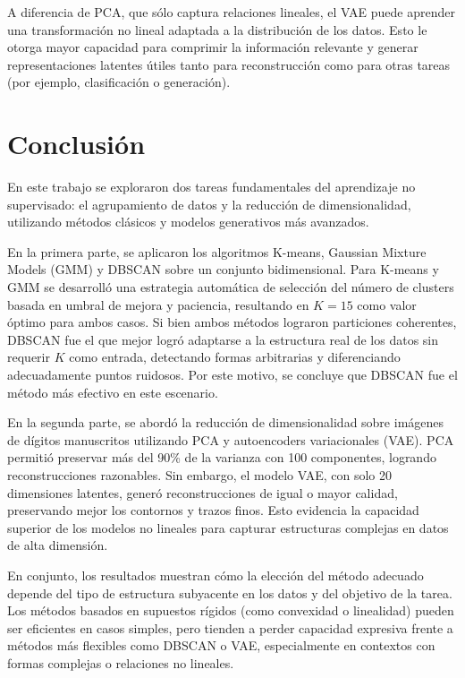 \documentclass[11pt]{article}
\begin{document}
A diferencia de PCA, que sólo captura relaciones lineales, el VAE puede aprender una transformación no lineal adaptada a la distribución de los datos. Esto le otorga mayor capacidad para comprimir la información relevante y generar representaciones latentes útiles tanto para reconstrucción como para otras tareas (por ejemplo, clasificación o generación).


\section{Conclusión}
En este trabajo se exploraron dos tareas fundamentales del aprendizaje no supervisado: el agrupamiento de datos y la reducción de dimensionalidad, utilizando métodos clásicos y modelos generativos más avanzados.

En la primera parte, se aplicaron los algoritmos K-means, Gaussian Mixture Models (GMM) y DBSCAN sobre un conjunto bidimensional. Para K-means y GMM se desarrolló una estrategia automática de selección del número de clusters basada en umbral de mejora y paciencia, resultando en $K = 15$ como valor óptimo para ambos casos. Si bien ambos métodos lograron particiones coherentes, DBSCAN fue el que mejor logró adaptarse a la estructura real de los datos sin requerir $K$ como entrada, detectando formas arbitrarias y diferenciando adecuadamente puntos ruidosos. Por este motivo, se concluye que DBSCAN fue el método más efectivo en este escenario.

En la segunda parte, se abordó la reducción de dimensionalidad sobre imágenes de dígitos manuscritos utilizando PCA y autoencoders variacionales (VAE). PCA permitió preservar más del 90\% de la varianza con 100 componentes, logrando reconstrucciones razonables. Sin embargo, el modelo VAE, con solo 20 dimensiones latentes, generó reconstrucciones de igual o mayor calidad, preservando mejor los contornos y trazos finos. Esto evidencia la capacidad superior de los modelos no lineales para capturar estructuras complejas en datos de alta dimensión.

En conjunto, los resultados muestran cómo la elección del método adecuado depende del tipo de estructura subyacente en los datos y del objetivo de la tarea. Los métodos basados en supuestos rígidos (como convexidad o linealidad) pueden ser eficientes en casos simples, pero tienden a perder capacidad expresiva frente a métodos más flexibles como DBSCAN o VAE, especialmente en contextos con formas complejas o relaciones no lineales.
\end{document}
